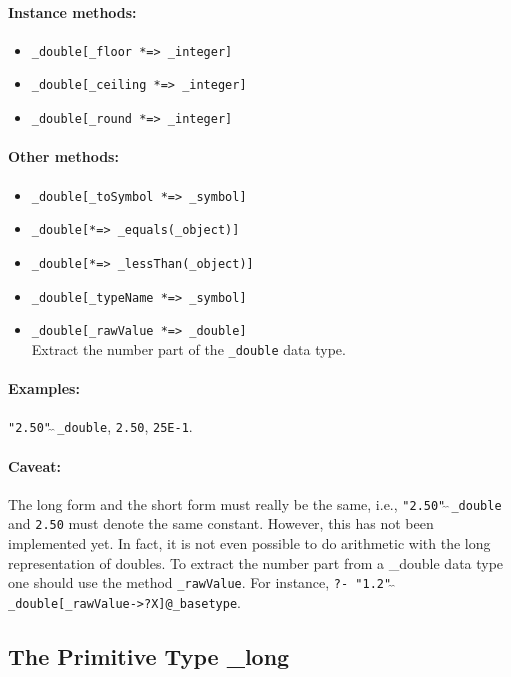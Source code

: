 \documentclass[11pt]{article}
\begin{document}
\paragraph{Instance methods:}
\begin{itemize}
\item {\tt \_double[\_floor *=> \_integer]}
\item {\tt \_double[\_ceiling *=> \_integer]}
\item {\tt \_double[\_round *=> \_integer]}
\end{itemize}

\paragraph{Other methods:}
\begin{itemize}
\item {\tt \_double[\_toSymbol *=> \_symbol]}
\item {\tt \_double[*=> \_equals(\_object)]}
\item {\tt \_double[*=> \_lessThan(\_object)]}
\item {\tt \_double[\_typeName *=> \_symbol]}
\item {\tt \_double[\_rawValue *=> \_double]}
  \\
  Extract the number part of the {\tt \_double} data type. 
\end{itemize}

\paragraph{Examples:}  {\tt "2.50"$\hat{~}\hat{~}$\_double}, {\tt 2.50},
{\tt 25E-1}.

\paragraph{Caveat:}  The long form and the short form must really be the
same, i.e., {\tt "2.50"$\hat{~}\hat{~}$\_double} and {\tt 2.50}
must denote the same constant.  However, this has not been implemented yet.
In fact, it is not even possible to do arithmetic with the long
representation of doubles. To extract the number part from a \_double data
type one should use the method {\tt \_rawValue}.  For instance,
{\tt ?- "1.2"$\hat{~}\hat{~}$\_double[\_rawValue->?X]@\_basetype}.

\subsection{ The Primitive Type \_long}
\end{document}
